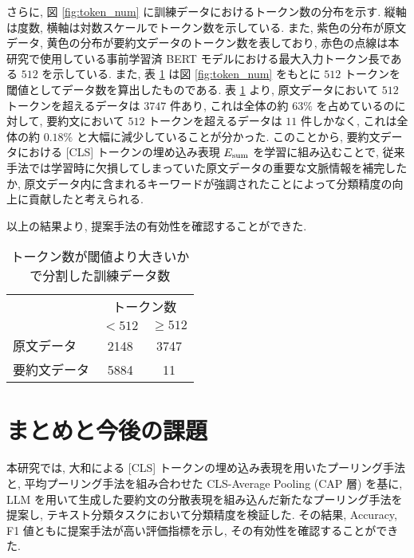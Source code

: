 \documentclass[twocolumn]{jarticle}
\begin{document}
さらに, 図 \ref{fig:token_num} に訓練データにおけるトークン数の分布を示す. 縦軸は度数, 横軸は対数スケールでトークン数を示している. また, 紫色の分布が原文データ, 黄色の分布が要約文データのトークン数を表しており, 赤色の点線は本研究で使用している事前学習済 BERT モデルにおける最大入力トークン長である $512$ を示している. また, 表 \ref{tab:token_num_table} は図 \ref{fig:token_num} をもとに $512$ トークンを閾値としてデータ数を算出したものである. 表 \ref{tab:token_num_table} より, 原文データにおいて $512$ トークンを超えるデータは $3747$ 件あり, これは全体の約 $63\%$ を占めているのに対して, 要約文において $512$ トークンを超えるデータは $11$ 件しかなく, これは全体の約 $0.18\%$ と大幅に減少していることが分かった. このことから, 要約文データにおける [CLS] トークンの埋め込み表現 $E_{\rm{sum}}$ を学習に組み込むことで, 従来手法では学習時に欠損してしまっていた原文データの重要な文脈情報を補完したか, 原文データ内に含まれるキーワードが強調されたことによって分類精度の向上に貢献したと考えられる.

以上の結果より, 提案手法の有効性を確認することができた.

\begin{table}[!t]
\centering
\caption{トークン数が閾値より大きいかで分割した訓練データ数}
\begin{tabular}{l|cc}
\multicolumn{1}{c|}{\multirow{2}{*}{}} & \multicolumn{2}{c}{トークン数} \\ \cline{2-3}
\multicolumn{1}{c|}{} & \multicolumn{1}{c|}{$< 512$} & $\geq 512$ \\ \hline
原文データ & \multicolumn{1}{c|}{2148} & 3747 \\
要約文データ & \multicolumn{1}{c|}{5884} & 11
\end{tabular}
\label{tab:token_num_table}
\end{table}

\newpage
\section{まとめと今後の課題}
本研究では, 大和による [CLS] トークンの埋め込み表現を用いたプーリング手法と, 平均プーリング手法を組み合わせた CLS-Average Pooling (CAP 層) を基に, LLM を用いて生成した要約文の分散表現を組み込んだ新たなプーリング手法を提案し, テキスト分類タスクにおいて分類精度を検証した. その結果, Accuracy, F1 値ともに提案手法が高い評価指標を示し, その有効性を確認することができた.
\end{document}
